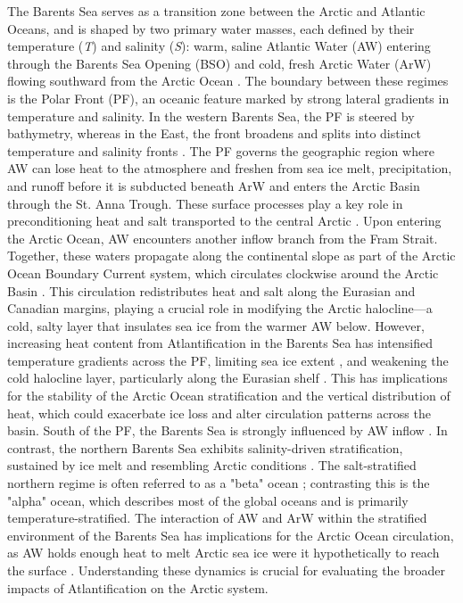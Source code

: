 \documentclass[draft]{agujournal2019}
\begin{document}
The Barents Sea serves as a transition zone between the Arctic and Atlantic Oceans, and is shaped by two primary water masses, each defined by their temperature (\emph{T}) and salinity (\emph{S}): warm, saline Atlantic Water (AW) entering through the Barents Sea Opening (BSO) and cold, fresh Arctic Water (ArW) flowing southward from the Arctic Ocean \cite{Loeng1991,Smedsrud2010}. The boundary between these regimes is the Polar Front (PF), an oceanic feature marked by strong lateral gradients in temperature and salinity. In the western Barents Sea, the PF is steered by bathymetry, whereas in the East, the front broadens and splits into distinct temperature and salinity fronts \cite{Oziel2016}. The PF governs the geographic region where AW can lose heat to the atmosphere and freshen from sea ice melt, precipitation, and runoff before it is subducted beneath ArW and enters the Arctic Basin through the St. Anna Trough. These surface processes play a key role in preconditioning heat and salt transported to the central Arctic \cite{Parsons1996,Munk1998,Garrett2003,Vage2014,kolas2024}. Upon entering the Arctic Ocean, AW encounters another inflow branch from the Fram Strait. Together, these waters propagate along the continental slope as part of the Arctic Ocean Boundary Current system, which circulates clockwise around the Arctic Basin \cite{Wang2020}. This circulation redistributes heat and salt along the Eurasian and Canadian margins, playing a crucial role in modifying the Arctic halocline—a cold, salty layer that insulates sea ice from the warmer AW below. However, increasing heat content from Atlantification in the Barents Sea has intensified temperature gradients across the PF, limiting sea ice extent \cite{Barton18}, and weakening the cold halocline layer, particularly along the Eurasian shelf \cite{Polyakov2020,Metzner2020}. This has implications for the stability of the Arctic Ocean stratification and the vertical distribution of heat, which could exacerbate ice loss and alter circulation patterns across the basin. South of the PF, the Barents Sea is strongly influenced by AW inflow \cite{Hakkinen2009}. In contrast, the northern Barents Sea exhibits salinity-driven stratification, sustained by ice melt and resembling Arctic conditions \cite{kolas2024}. The salt-stratified northern regime is often referred to as a "beta" ocean \cite{Nansen1902,Carmack2007,Stewart2016}; contrasting this is the "alpha" ocean, which describes most of the global oceans and is primarily temperature-stratified. The interaction of AW and ArW within the stratified environment of the Barents Sea has implications for the Arctic Ocean circulation, as AW holds enough heat to melt Arctic sea ice were it hypothetically to reach the surface \cite{Polyakov2017,Stroeve2018,Grabon2021}. Understanding these dynamics is crucial for evaluating the broader impacts of Atlantification on the Arctic system.
\end{document}
